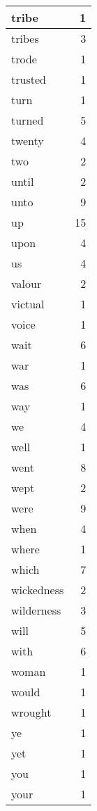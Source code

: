 \begin{center}
\begin{longtable}{l|r}
tribe & 1 \\ \hline
tribes & 3 \\ \hline
trode & 1 \\ \hline
trusted & 1 \\ \hline
turn & 1 \\ \hline
turned & 5 \\ \hline
twenty & 4 \\ \hline
two & 2 \\ \hline
until & 2 \\ \hline
unto & 9 \\ \hline
up & 15 \\ \hline
upon & 4 \\ \hline
us & 4 \\ \hline
valour & 2 \\ \hline
victual & 1 \\ \hline
voice & 1 \\ \hline
wait & 6 \\ \hline
war & 1 \\ \hline
was & 6 \\ \hline
way & 1 \\ \hline
we & 4 \\ \hline
well & 1 \\ \hline
went & 8 \\ \hline
wept & 2 \\ \hline
were & 9 \\ \hline
when & 4 \\ \hline
where & 1 \\ \hline
which & 7 \\ \hline
wickedness & 2 \\ \hline
wilderness & 3 \\ \hline
will & 5 \\ \hline
with & 6 \\ \hline
woman & 1 \\ \hline
would & 1 \\ \hline
wrought & 1 \\ \hline
ye & 1 \\ \hline
yet & 1 \\ \hline
you & 1 \\ \hline
your & 1 \\ \hline
\end{longtable}
\end{center}



\normalsize



